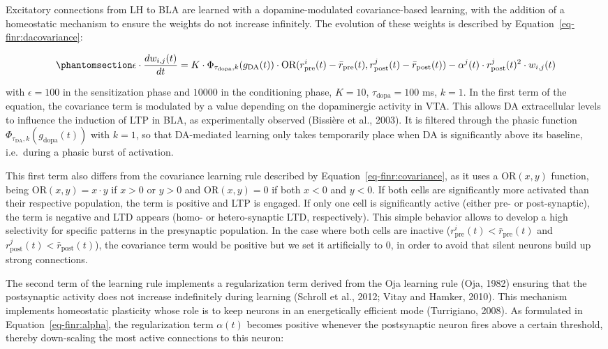 \documentclass[
  11pt,
  a4paper,
]{scrbook}
\begin{document}
Excitatory connections from LH to BLA are learned with a
dopamine-modulated covariance-based learning, with the addition of a
homeostatic mechanism to ensure the weights do not increase infinitely.
The evolution of these weights is described by
Equation~\ref{eq-finr:dacovariance}:

\begin{equation}\phantomsection\label{eq-finr:dacovariance}{
    \epsilon \cdot \frac{dw_{i, j}(t)}{dt} =  
            K \cdot \Phi_{\tau_{\text{dopa}}, k} (g_{\text{DA}}(t) ) \cdot \text{OR}(r^i_{\text{pre}}(t) - \bar{r}_{\text{pre}}(t), r^j_{\text{post}}(t) - \bar{r}_{\text{post}}(t))
            - \alpha^j(t) \cdot r^j_{\text{post}}(t)^2 \cdot w_{i, j}(t)  
}\end{equation}

with \(\epsilon = 100\) in the sensitization phase and \(10000\) in the
conditioning phase, \(K=10\), \(\tau_{\text{dopa}}=100\) ms, \(k=1\). In
the first term of the equation, the covariance term is modulated by a
value depending on the dopaminergic activity in VTA. This allows DA
extracellular levels to influence the induction of LTP in BLA, as
experimentally observed (Bissière et al., 2003). It is filtered through
the phasic function \(\Phi_{\tau_{\text{DA}}, k} (g_{\text{dopa}}(t))\)
with \(k=1\), so that DA-mediated learning only takes temporarily place
when DA is significantly above its baseline, i.e.~during a phasic burst
of activation.

This first term also differs from the covariance learning rule described
by Equation~\ref{eq-finr:covariance}, as it uses a \(\text{OR}(x, y)\)
function, being \(\text{OR}(x, y) = x \cdot y\) if \(x >0\) or \(y>0\)
and \(\text{OR}(x, y) = 0\) if both \(x<0\) and \(y<0\). If both cells
are significantly more activated than their respective population, the
term is positive and LTP is engaged. If only one cell is significantly
active (either pre- or post-synaptic), the term is negative and LTD
appears (homo- or hetero-synaptic LTD, respectively). This simple
behavior allows to develop a high selectivity for specific patterns in
the presynaptic population. In the case where both cells are inactive
(\(r^i_{\text{pre}}(t) < \bar{r}_{\text{pre}}(t)\) and
\(r^j_{\text{post}}(t) < \bar{r}_{\text{post}}(t)\)), the covariance
term would be positive but we set it artificially to 0, in order to
avoid that silent neurons build up strong connections.

The second term of the learning rule implements a regularization term
derived from the Oja learning rule (Oja, 1982) ensuring that the
postsynaptic activity does not increase indefinitely during learning
(Schroll et al., 2012; Vitay and Hamker, 2010). This mechanism
implements homeostatic plasticity whose role is to keep neurons in an
energetically efficient mode (Turrigiano, 2008). As formulated in
Equation~\ref{eq-finr:alpha}, the regularization term \(\alpha(t)\)
becomes positive whenever the postsynaptic neuron fires above a certain
threshold, thereby down-scaling the most active connections to this
neuron:
\end{document}
